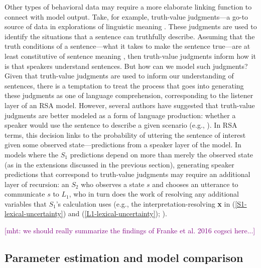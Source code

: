 \documentclass{sp}
\newcommand{\gcs}[1]{\textcolor{blue}{[gcs: #1]}}
\newcommand{\mht}[1]{\textcolor{purple}{[mht: #1]}}
\begin{document}
Other types of behavioral data may require a more elaborate linking function to connect with model output. Take, for example, truth-value judgments---a go-to source of data in explorations of linguistic meaning \citep{crainmckee1985,crainthornton1998}. These judgments are used to identify the situations that a sentence can truthfully describe. Assuming that the truth conditions of a sentence---what it takes to make the sentence true---are at least constitutive of sentence meaning \citep[e.g.,][]{chierchiamcconnellginet2000}, then truth-value judgments inform how it is that speakers understand sentences. But how can we model such judgments? Given that truth-value judgments are used to inform our understanding of sentences, there is a temptation to treat the process that goes into generating these judgments as one of language comprehension, corresponding to the listener layer of an RSA model. However, several authors have suggested that truth-value judgments are better modeled as a form of language production: whether a speaker would use the sentence to describe a given scenario (e.g., \citealp{degengoodman2014,savinellietal2017,tesslergoodman2019, jasbietal2019}). In RSA terms, this decision links to the probability of uttering the sentence of interest given some observed state---predictions from a speaker layer of the model. In models where the $S_1$ predictions depend on more than merely the observed state (as in the extensions discussed in the previous section), generating speaker predictions that correspond to truth-value judgments may require an additional layer of recursion: an $S_2$ who observes a state $s$ and chooses an utterance to communicate $s$ to $L_1$, who in turn does the work of resolving any additional variables that $S_1$'s calculation uses (e.g., the interpretation-resolving \textbf{x} in (\ref{S1-lexical-uncertainty}) and (\ref{L1-lexical-uncertainty}); \citealp{savinellietal2017}).


\mht{we should really summarize the findings of Franke et al. 2016 cogsci here...}

\subsection{Parameter estimation and model comparison}
\end{document}
